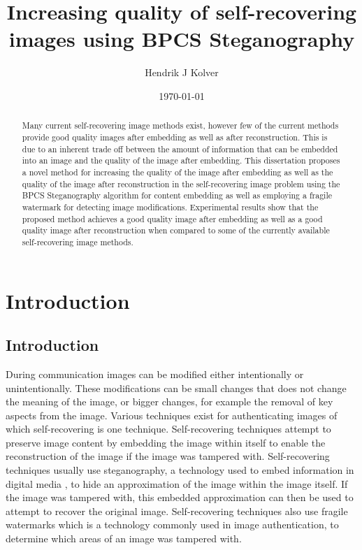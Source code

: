 \documentclass[12pt]{article}
\title{Increasing quality of self-recovering images using BPCS Steganography}
\author{Hendrik J Kolver}
\date{\today}
\begin{document}
\maketitle

\begin{abstract}

\noindent 
Many current self-recovering image methods exist, however few of the current methods provide good quality images after embedding as well as after reconstruction.
This is due to an inherent trade off between the amount of information that can be embedded into an image and the quality of the image after embedding.
This dissertation proposes a novel method for increasing the quality of the image after embedding as well as the quality of the image after reconstruction in the self-recovering image problem using the BPCS Steganography algorithm for content embedding as well as employing a fragile watermark for detecting image modifications.
Experimental results show that the proposed method achieves a good quality image after embedding as well as a good quality image after reconstruction when compared to some of the currently available self-recovering image methods. 

\end{abstract}

\tableofcontents
\section{Introduction}

\subsection{Introduction}
During communication images can be modified either intentionally or unintentionally.  These modifications can be small changes that does not change the meaning of the image, or bigger changes, for example the removal of key aspects from the image. 
Various techniques exist for authenticating images of which self-recovering is one technique. 
Self-recovering techniques attempt to preserve image content by embedding the image within itself to enable the reconstruction of the image if the image was tampered with. Self-recovering techniques usually use steganography, a technology used to embed information in digital media \cite{johnson1998exploring}, to hide an approximation of the image within the image itself.  
If the image was tampered with, this embedded approximation can then be used to attempt to recover the original image.
 Self-recovering techniques also use fragile watermarks which is a technology commonly used in image authentication, to determine which areas of an image was tampered with.
\end{document}
